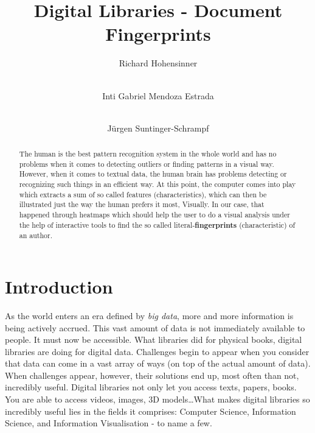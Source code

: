 \documentclass[runningheads]{llncs}
\begin{document}
\title{Digital Libraries - Document Fingerprints}

\author{Richard Hohensinner \and \\
Inti Gabriel Mendoza Estrada \and     \\
Jürgen Suntinger-Schrampf}

\maketitle              %


\begin{abstract}
The human is the best pattern recognition system in the whole world and has no problems when it comes to detecting outliers or finding patterns in a visual way. However, when it comes to textual data, the human brain has problems detecting or recognizing such things in an efficient way. At this point, the computer comes into play which extracts a sum of so called features (characteristics), which can then be illustrated just the way the human prefers it most, Visually. In our case, that happened through heatmaps which should help the user to do a visual analysis under the help of interactive tools to find the so called literal-\textbf{fingerprints} (characteristic) of an author.

\end{abstract}


\section{Introduction}
As the world enters an era defined by \textit{big data}, more and more information is being actively accrued. This vast amount of data is not immediately available to people. It must now be accessible. What libraries did for physical books, digital libraries are doing for digital data. Challenges begin to appear when you consider that data can come in a vast array of ways (on top of the actual amount of data). When challenges appear, however, their solutions end up, most often than not, incredibly useful. Digital libraries not only let you access texts, papers, books. You are able to access videos, images, 3D models\ldots What makes digital libraries so incredibly useful lies in the fields it comprises: Computer Science, Information Science, and Information Visualisation - to name a few. 
\end{document}
